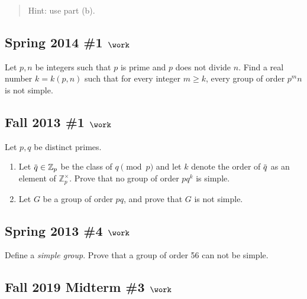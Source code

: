 \begin{quote}
Hint: use part (b).
\end{quote}

\hypertarget{spring-2014-1-work}{%
\subsection{\texorpdfstring{Spring 2014 \#1
\(\work\)}{Spring 2014 \#1 \textbackslash work}}\label{spring-2014-1-work}}

Let \(p, n\) be integers such that \(p\) is prime and \(p\) does not
divide \(n\). Find a real number \(k = k (p, n)\) such that for every
integer \(m\geq k\), every group of order \(p^m n\) is not simple.

\hypertarget{fall-2013-1-work}{%
\subsection{\texorpdfstring{Fall 2013 \#1
\(\work\)}{Fall 2013 \#1 \textbackslash work}}\label{fall-2013-1-work}}

Let \(p, q\) be distinct primes.

\begin{enumerate}
\def\labelenumi{\alph{enumi}.}
\item
  Let
  \(\mkern 1.5mu\overline{\mkern-1.5muq\mkern-1.5mu}\mkern 1.5mu \in {\mathbb{Z}}_p\)
  be the class of \(q\pmod p\) and let \(k\) denote the order of
  \(\mkern 1.5mu\overline{\mkern-1.5muq\mkern-1.5mu}\mkern 1.5mu\) as an
  element of \({\mathbb{Z}}_p^{\times}\). Prove that no group of order
  \(pq^k\) is simple.
\item
  Let \(G\) be a group of order \(pq\), and prove that \(G\) is not
  simple.
\end{enumerate}

\hypertarget{spring-2013-4-work}{%
\subsection{\texorpdfstring{Spring 2013 \#4
\(\work\)}{Spring 2013 \#4 \textbackslash work}}\label{spring-2013-4-work}}

Define a \emph{simple group}. Prove that a group of order 56 can not be
simple.

\hypertarget{fall-2019-midterm-3-work}{%
\subsection{\texorpdfstring{Fall 2019 Midterm \#3
\(\work\)}{Fall 2019 Midterm \#3 \textbackslash work}}\label{fall-2019-midterm-3-work}}

